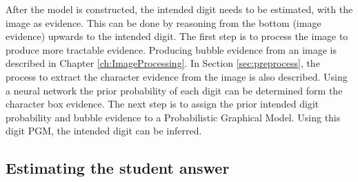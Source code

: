 

After the model is constructed, the intended digit needs to be estimated, with the image as evidence. This can be done by reasoning from the bottom (image evidence) upwards to the intended digit. The first step is to process the image to produce more tractable evidence. Producing bubble evidence from an image is described in Chapter \ref{ch:ImageProcessing}. In Section \ref{sec:preprocess}, the process to extract the character evidence from the image is also described. Using a neural network the prior probability of each digit can be determined form the character box evidence. The next step is to assign the prior intended digit probability and bubble evidence to a Probabilistic Graphical Model. Using this digit PGM, the intended digit can be inferred.

\subsection{Estimating the student answer}
\label{sec:studentAnswer}

